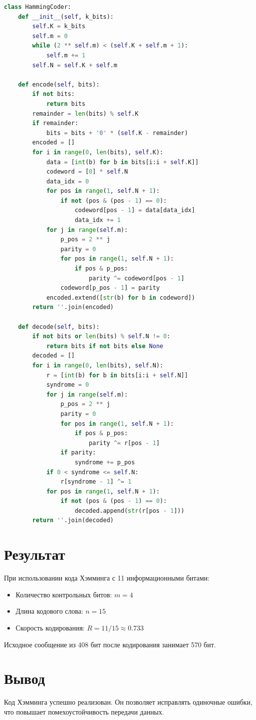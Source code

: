 \begin{lstlisting}[language=Python, caption=Кодек Хэмминга]
class HammingCoder:
    def __init__(self, k_bits):
        self.K = k_bits
        self.m = 0
        while (2 ** self.m) < (self.K + self.m + 1):
            self.m += 1
        self.N = self.K + self.m

    def encode(self, bits):
        if not bits:
            return bits
        remainder = len(bits) % self.K
        if remainder:
            bits = bits + '0' * (self.K - remainder)
        encoded = []
        for i in range(0, len(bits), self.K):
            data = [int(b) for b in bits[i:i + self.K]]
            codeword = [0] * self.N
            data_idx = 0
            for pos in range(1, self.N + 1):
                if not (pos & (pos - 1) == 0):
                    codeword[pos - 1] = data[data_idx]
                    data_idx += 1
            for j in range(self.m):
                p_pos = 2 ** j
                parity = 0
                for pos in range(1, self.N + 1):
                    if pos & p_pos:
                        parity ^= codeword[pos - 1]
                codeword[p_pos - 1] = parity
            encoded.extend([str(b) for b in codeword])
        return ''.join(encoded)

    def decode(self, bits):
        if not bits or len(bits) % self.N != 0:
            return bits if not bits else None
        decoded = []
        for i in range(0, len(bits), self.N):
            r = [int(b) for b in bits[i:i + self.N]]
            syndrome = 0
            for j in range(self.m):
                p_pos = 2 ** j
                parity = 0
                for pos in range(1, self.N + 1):
                    if pos & p_pos:
                        parity ^= r[pos - 1]
                if parity:
                    syndrome += p_pos
            if 0 < syndrome <= self.N:
                r[syndrome - 1] ^= 1
            for pos in range(1, self.N + 1):
                if not (pos & (pos - 1) == 0):
                    decoded.append(str(r[pos - 1]))
        return ''.join(decoded)
\end{lstlisting}

\section{Результат}
При использовании кода Хэмминга с 11 информационными битами:
\begin{itemize}
    \item Количество контрольных битов: $m = 4$
    \item Длина кодового слова: $n = 15$
    \item Скорость кодирования: $R = 11/15 \approx 0.733$
\end{itemize}

Исходное сообщение из 408 бит после кодирования занимает 570 бит.

\section{Вывод}
Код Хэмминга успешно реализован. Он позволяет исправлять одиночные ошибки, что повышает помехоустойчивость передачи данных.